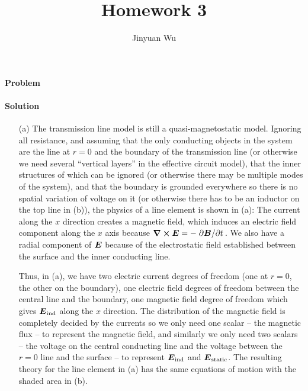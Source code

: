 \documentclass[hyperref, a4paper]{article}
\title{Homework 3}
\author{Jinyuan Wu}
\begin{document}
\maketitle

\paragraph{Problem} 

\paragraph{Solution} 
\begin{itemize}
\item[(a)] The transmission line model is still a quasi-magnetostatic model.
Ignoring all resistance, and assuming that 
the only conducting objects in the system 
are the line at $r = 0$ and the boundary of the transmission line
(or otherwise we need several ``vertical layers'' in the effective circuit model),
that the inner structures of which can be ignored
(or otherwise there may be multiple modes of the system),
and that the boundary is grounded everywhere so there is no spatial variation of voltage on it
(or otherwise there has to be an inductor on the top line in (b)),
the physics of a line element is shown in (a):
The current along the $x$ direction creates a magnetic field, 
which induces an electric field component along the $x$ axis 
because $\curl{\vb*{E}} = - \pdv*{\vb*{B}}{t}$.
We also have a radial component of $\vb*{E}$ 
because of the electrostatic field established between the surface and the inner conducting line.

Thus, in (a),
we have two electric current degrees of freedom (one at $r=0$, the other on the boundary),
one electric field degrees of freedom between the central line and the boundary,
one magnetic field degree of freedom 
which gives $\vb*{E}_{\text{ind}}$ along the $x$ direction.
The distribution of the magnetic field is completely decided by the currents 
so we only need one scalar -- the magnetic flux -- to represent the magnetic field,
and similarly we only need two scalars -- the voltage on the central conducting line 
and the voltage between the $r=0$ line and the surface -- 
to represent $\vb*{E}_{\text{ind}}$ and $\vb*{E}_{\text{static}}$.
The resulting theory for the line element in (a) 
has the same equations of motion with the shaded area in (b).


\end{itemize}
\end{document}
